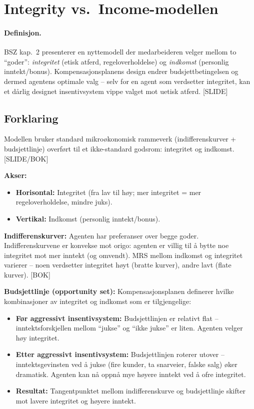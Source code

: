\section{Integrity vs.\ Income-modellen}\label{thr:integrity-vs-income-model}

\paragraph{Definisjon.} BSZ kap.\ 2 presenterer en nyttemodell der medarbeideren velger mellom to ``goder'': \emph{integritet} (etisk atferd, regeloverholdelse) og \emph{indkomst} (personlig inntekt/bonus). Kompensasjonsplanens design endrer budsjettbetingelsen og dermed agentens optimale valg -- selv for en agent som verdsetter integritet, kan et dårlig designet insentivsystem vippe valget mot uetisk atferd. [SLIDE]

\subsection*{Forklaring}

Modellen bruker standard mikroøkonomisk rammeverk (indifferenskurver + budsjettlinje) overført til et ikke-standard godsrom: integritet og indkomst. [SLIDE/BOK]

\textbf{Akser:}
\begin{itemize}\setlength{\itemsep}{1pt}
\item \textbf{Horisontal:} Integritet (fra lav til høy; mer integritet = mer regeloverholdelse, mindre juks).
\item \textbf{Vertikal:} Indkomst (personlig inntekt/bonus).
\end{itemize}

\textbf{Indifferenskurver:} Agenten har preferanser over begge goder. Indifferenskurvene er konvekse mot origo: agenten er villig til å bytte noe integritet mot mer inntekt (og omvendt). MRS mellom indkomst og integritet varierer -- noen verdsetter integritet høyt (bratte kurver), andre lavt (flate kurver). [BOK]

\textbf{Budsjettlinje (opportunity set):} Kompensasjonsplanen definerer hvilke kombinasjoner av integritet og indkomst som er tilgjengelige:
\begin{itemize}\setlength{\itemsep}{2pt}
\item \textbf{Før aggressivt insentivsystem:} Budsjettlinjen er relativt flat -- inntektsforskjellen mellom ``jukse'' og ``ikke jukse'' er liten. Agenten velger høy integritet.
\item \textbf{Etter aggressivt insentivsystem:} Budsjettlinjen roterer utover -- inntektsgevinsten ved å jukse (fire kunder, ta snarveier, falske salg) øker dramatisk. Agenten kan nå oppnå mye høyere inntekt ved å ofre integritet.
\item \textbf{Resultat:} Tangentpunktet mellom indifferenskurve og budsjettlinje skifter mot lavere integritet og høyere inntekt.
\end{itemize}

